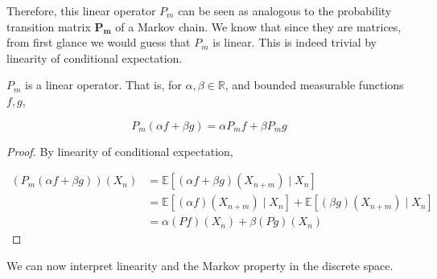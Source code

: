 \documentclass{article}
\begin{document}
  Therefore, this linear operator $P_m$ can be seen as analogous to the probability transition matrix $\mathbf{P_m}$ of a Markov chain. We know that since they are matrices, from first glance we would guess that $P_m$ is linear. This is indeed trivial by linearity of conditional expectation. 

  \begin{lemma}
    $P_m$ is a linear operator. That is, for $\alpha, \beta \in \mathbb{R}$, and bounded measurable functions $f, g$, 

      \[P_m (\alpha f + \beta g) = \alpha P_m f + \beta P_m g\] 
  \end{lemma}
  \begin{proof}
    By linearity of conditional expectation, 

    \begin{align*}
      (P_m (\alpha f + \beta g))(X_n) & = \mathbb{E}[(\alpha f + \beta g)(X_{n+m}) \mid X_n] \\
      & = \mathbb{E}[(\alpha f) (X_{n + m}) \mid X_n] + \mathbb{E}[(\beta g) (X_{n+m}) \mid X_n] \\
      & = \alpha (P f) (X_n) + \beta (P g) (X_n)
    \end{align*}
  \end{proof}

  We can now interpret linearity and the Markov property in the discrete space. 
\end{document}
